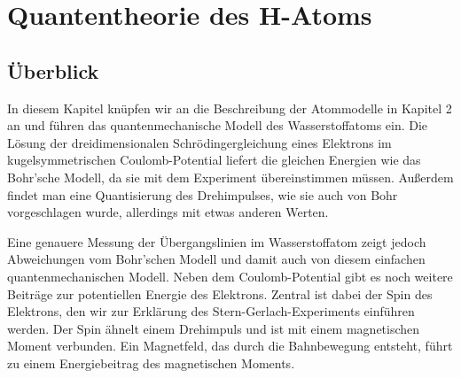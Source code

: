 \renewcommand{\lastmod}{9. November 2024}
\renewcommand{\chapterauthors}{Markus Lippitz}

\chapter{Quantentheorie des H-Atoms}









\section{Überblick}

In diesem Kapitel knüpfen wir an die Beschreibung der Atommodelle in Kapitel 2 an und führen das quantenmechanische Modell des Wasserstoffatoms ein. Die Lösung der dreidimensionalen Schrödingergleichung eines Elektrons im kugelsymmetrischen Coulomb-Potential liefert die gleichen Energien wie das Bohr'sche Modell, da sie mit dem Experiment übereinstimmen müssen. Außerdem findet man eine Quantisierung des Drehimpulses, wie sie auch von Bohr vorgeschlagen wurde, allerdings mit etwas anderen Werten.

Eine genauere Messung der Übergangslinien im Wasserstoffatom zeigt jedoch Abweichungen vom Bohr'schen Modell und damit auch von diesem einfachen quantenmechanischen Modell. Neben dem Coulomb-Potential gibt es noch weitere Beiträge zur potentiellen Energie des Elektrons. Zentral ist dabei der Spin des Elektrons, den wir zur Erklärung des Stern-Gerlach-Experiments einführen werden. Der Spin ähnelt einem Drehimpuls und ist mit einem magnetischen Moment verbunden. Ein Magnetfeld, das durch die Bahnbewegung entsteht, führt zu einem Energiebeitrag des magnetischen Moments.

